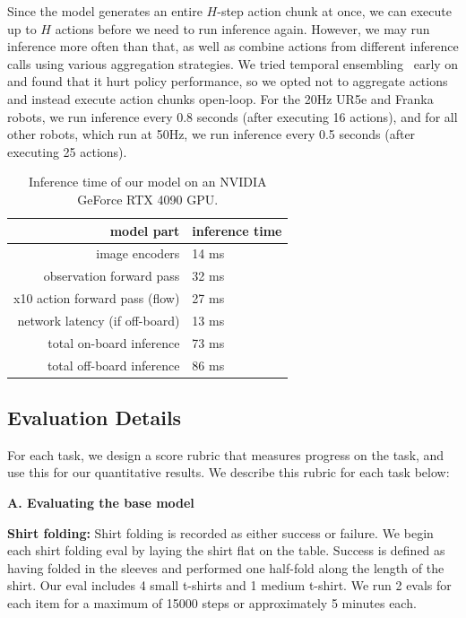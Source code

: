 Since the model generates an entire $H$-step action chunk at once, we can execute up to $H$ actions before we need to run inference again. However, we may run inference more often than that, as well as combine actions from different inference calls using various aggregation strategies. We tried temporal ensembling~\citep{zhao2023learning} early on and found that it hurt policy performance, so we opted not to aggregate actions and instead execute action chunks open-loop. For the 20Hz UR5e and Franka robots, we run inference every 0.8 seconds (after executing 16 actions), and for all other robots, which run at 50Hz, we run inference every 0.5 seconds (after executing 25 actions).
\begin{table}[h]
\centering
\begin{tabular}{rl}
\toprule
\textbf{model part} & \textbf{inference time} \\
\midrule
image encoders & 14 ms  \\
observation forward pass & 32 ms \\
x10 action forward pass (flow) & 27 ms \\
network latency (if off-board) & 13 ms \\
\midrule
total on-board inference & 73 ms \\
total off-board inference & 86 ms \\
\bottomrule
\end{tabular}
\caption{Inference time of our model on an NVIDIA GeForce RTX 4090 GPU.}
\label{tab:inference_time}
\end{table}

\subsection{Evaluation Details}
\label{app:score}

For each task, we design a score rubric that measures progress on the task, and use this for our quantitative results. We describe this rubric for each task below:

\noindent \textbf{A. Evaluating the base model} 

\noindent \textbf{Shirt folding:} Shirt folding is recorded as either success or failure. We begin each shirt folding eval by laying the shirt flat on the table. Success is defined as having folded in the sleeves and performed one half-fold along the length of the shirt. Our eval includes 4 small t-shirts and 1 medium t-shirt. We run 2 evals for each item for a maximum of 15000 steps or approximately 5 minutes each.

